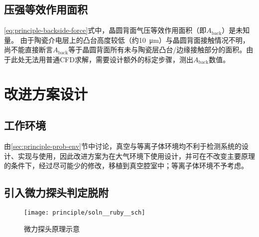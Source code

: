 \clearpage


\subsection{压强等效作用面积}\label{principle-prob-area}

\eqref{eq:principle-backside-force}式中，晶圆背面气压等效作用面积（即$A_{\mathrm{back}}$）是未知量。
由于陶瓷介电层上的凸台高度较低（约\SI{10}{\um}）与晶圆背面接触情况不明，尚不能直接断言$A_{\mathrm{back}}$等于晶圆背面所有未与陶瓷层凸台/边缘接触部分的面积。由于此处无法用普通CFD求解，需要设计额外的标定步骤，测出$A_{\mathrm{back}}$数值。



\section{改进方案设计}\label{principle-soln}


\subsection{工作环境}\label{principle-soln-env}

由\ref{sec:principle-prob-env}节中讨论，真空与等离子体环境均不利于检测系统的设计、实现与使用，因此改进方案为在大气环境下使用设计，并可在不改变主要原理的条件下，经过尽可能少的修改，移植到真空腔室中；等离子体环境不予考虑。


\subsection{引入微力探头判定脱附}\label{principle-soln-ruby}

\begin{figure}[tbhp]
\centering
\texttt{[image: principle/soln\_\_ruby\_\_sch]}
\caption{微力探头原理示意}
\label{fig:principle-soln-ruby-sch}
\end{figure}

